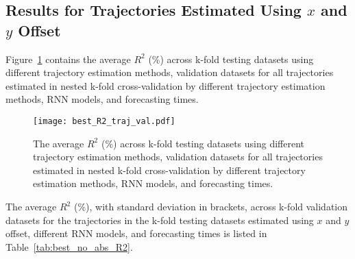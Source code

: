 \subsection{Results for Trajectories Estimated Using $x$ and $y$ Offset}

Figure~\ref{fig:best_R2_traj_val} contains the average $R^{2}$ (\%) across k-fold testing datasets using different trajectory estimation methods, validation datasets for all trajectories estimated in nested k-fold cross-validation by different trajectory estimation methods, RNN models, and forecasting times.

\begin{figure}[!ht]
	\centering
	\texttt{[image: best\_R2\_traj\_val.pdf]}
	\caption{The average $R^{2}$ (\%) across k-fold testing datasets using different trajectory estimation methods, validation datasets for all trajectories estimated in nested k-fold cross-validation by different trajectory estimation methods, RNN models, and forecasting times.}
	\label{fig:best_R2_traj_val}
\end{figure}

The average $R^{2}$ (\%), with standard deviation in brackets, across k-fold validation datasets for the trajectories in the k-fold testing datasets estimated using $x$ and $y$ offset, different RNN models, and forecasting times is listed in Table~\ref{tab:best_no_abs_R2}.

\begin{table}[!ht]
	\centering
	\caption{The average $R^{2}$ (\%), with standard deviation in brackets, across k-fold validation datasets for the trajectories in the k-fold testing datasets estimated using $x$ and $y$ offset, different RNN models, and forecasting times.}
	\label{tab:best_no_abs_R2}
\end{table}

